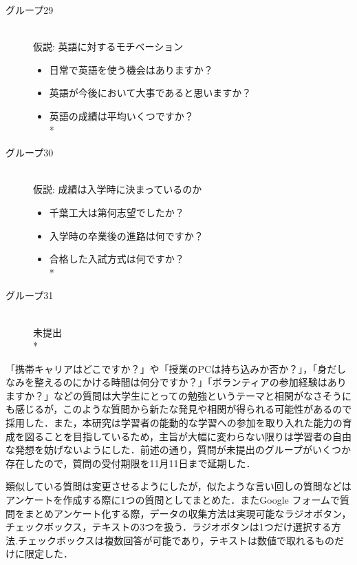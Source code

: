 \begin{description}
 \item[グループ29]\mbox{}\\
 仮説: 英語に対するモチベーション
	    \begin{itemize}
   	\item 日常で英語を使う機会はありますか？
   	\item 英語が今後において大事であると思いますか？
   	\item 英語の成績は平均いくつですか？   \vspace{0.1in} \\*
	\end{itemize}

 \item[グループ30]\mbox{}\\
 仮説: 成績は入学時に決まっているのか
	    \begin{itemize}
   	\item 千葉工大は第何志望でしたか？
   	\item 入学時の卒業後の進路は何ですか？
   	\item 合格した入試方式は何ですか？   \vspace{0.1in} \\*
	\end{itemize}

 \item[グループ31]\mbox{}\\
 未提出   \vspace{0.2in} \\*


\end{description}

\newpage

「携帯キャリアはどこですか？」や「授業のPCは持ち込みか否か？」，「身だしなみを整えるのにかける時間は何分ですか？」「ボランティアの参加経験はありますか？」などの質問は大学生にとっての勉強というテーマと相関がなさそうにも感じるが，このような質問から新たな発見や相関が得られる可能性があるので採用した．また，本研究は学習者の能動的な学習への参加を取り入れた能力の育成を図ることを目指しているため，主旨が大幅に変わらない限りは学習者の自由な発想を妨げないようにした．前述の通り，質問が未提出のグループがいくつか存在したので，質問の受付期限を11月11日まで延期した．

類似している質問は変更させるようにしたが，似たような言い回しの質問などはアンケートを作成する際に1つの質問としてまとめた．またGoogle フォームで質問をまとめアンケート化する際，データの収集方法は実現可能なラジオボタン，チェックボックス，テキストの3つを扱う．ラジオボタンは1つだけ選択する方法.チェックボックスは複数回答が可能であり，テキストは数値で取れるものだけに限定した．

